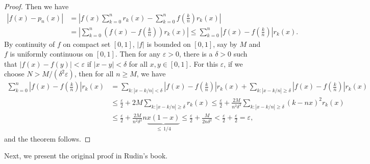 \documentclass[10pt]{book}
\theoremstyle{definition}
\numberwithin{equation}{chapter}
\begin{document}
\begin{proof}
Then we have
\begin{align*}
    \left|f(x) - p_n(x)\right| & = \left|f(x) \sum^n_{k=0} r_k(x) - \sum^n_{k=0} f\left(\frac{k}{n}\right) r_k(x)\right| \\
    & = \left|\sum^n_{k=0} \left(f(x) - f\left(\frac{k}{n}\right)\right) r_k(x)\right| \leq \sum^n_{k=0} \left|f(x) - f\left(\frac{k}{n}\right)\right| r_k(x).
\end{align*}
By continuity of $f$ on compact set $[0,1]$, $\left|f\right|$ is bounded on $[0,1]$, say by $M$ and $f$ is uniformly continuous on $[0,1]$. Then for any $\varepsilon > 0$, there is a $\delta > 0$ such that $\left|f(x) - f(y)\right| < \varepsilon$ if $\left|x - y\right| < \delta$ for all $x,y \in [0,1]$. For this $\varepsilon$, if we choose $N > M/(\delta^2 \varepsilon)$, then for all $n \geq M$, we have
\begin{align*}
    \sum^n_{k=0} \left|f(x) - f\left(\frac{k}{n}\right)\right| r_k(x) & = \sum_{k:\left|x-k/n\right|<\delta} \left|f(x) - f\left(\frac{k}{n}\right)\right| r_k(x) + \sum_{k:\left|x-k/n\right|\geq \delta} \left|f(x) - f\left(\frac{k}{n}\right)\right| r_k(x) \\
    & \leq \frac{\varepsilon}{2} + 2M \sum_{k:\left|x-k/n\right|\geq \delta} r_k(x) 
    \leq \frac{\varepsilon}{2} + \frac{2M}{n^2\delta^2} \sum_{k:\left|x-k/n\right|\geq \delta} (k - nx)^2 r_k(x) \\
    & \leq \frac{\varepsilon}{2} + \frac{2M}{n^2\delta^2} n \underbrace{x(1 - x)}_{\leq\, 1/4} \leq \frac{\varepsilon}{2} + \frac{M}{2n\delta^2} < \frac{\varepsilon}{2} + \frac{\varepsilon}{2} = \varepsilon,
\end{align*}
and the theorem follows.
\end{proof}

\medskip

Next, we present the original proof in Rudin's book.

\medskip
\end{document}
